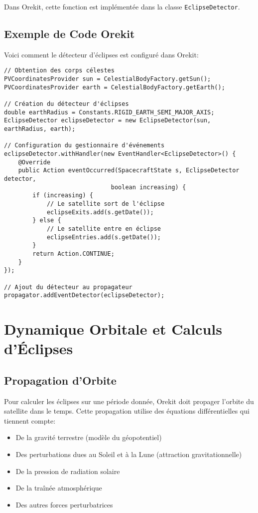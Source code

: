 \documentclass[12pt,a4paper]{article}
\begin{document}
Dans Orekit, cette fonction est implémentée dans la classe \texttt{EclipseDetector}.

\subsection{Exemple de Code Orekit}

Voici comment le détecteur d'éclipses est configuré dans Orekit:

\begin{verbatim}
// Obtention des corps célestes
PVCoordinatesProvider sun = CelestialBodyFactory.getSun();
PVCoordinatesProvider earth = CelestialBodyFactory.getEarth();

// Création du détecteur d'éclipses
double earthRadius = Constants.RIGID_EARTH_SEMI_MAJOR_AXIS;
EclipseDetector eclipseDetector = new EclipseDetector(sun, earthRadius, earth);

// Configuration du gestionnaire d'événements
eclipseDetector.withHandler(new EventHandler<EclipseDetector>() {
    @Override
    public Action eventOccurred(SpacecraftState s, EclipseDetector detector, 
                              boolean increasing) {
        if (increasing) {
            // Le satellite sort de l'éclipse
            eclipseExits.add(s.getDate());
        } else {
            // Le satellite entre en éclipse
            eclipseEntries.add(s.getDate());
        }
        return Action.CONTINUE;
    }
});

// Ajout du détecteur au propagateur
propagator.addEventDetector(eclipseDetector);
\end{verbatim}

\section{Dynamique Orbitale et Calculs d'Éclipses}

\subsection{Propagation d'Orbite}

Pour calculer les éclipses sur une période donnée, Orekit doit propager l'orbite du satellite dans le temps. Cette propagation utilise des équations différentielles qui tiennent compte:

\begin{itemize}
    \item De la gravité terrestre (modèle du géopotentiel)
    \item Des perturbations dues au Soleil et à la Lune (attraction gravitationnelle)
    \item De la pression de radiation solaire
    \item De la traînée atmosphérique
    \item Des autres forces perturbatrices
\end{itemize}
\end{document}
